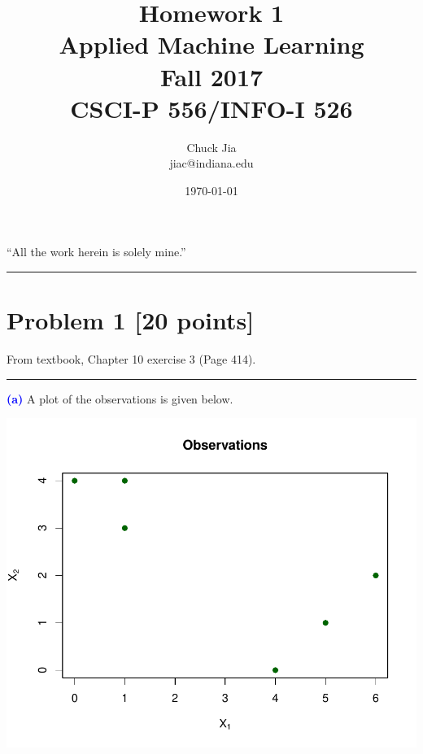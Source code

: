 \documentclass[a4paper,11pt]{article}
\newcommand{\quotes}[1]{``#1''}
\newcommand{\qnum}[1]{\noindent\textcolor{blue}{\textbf{(#1)}}}
\newcommand{\sep}{\begin{center}\textcolor{gray}{\rule{\textwidth}{0.75pt}}\end{center}}
\begin{document}
\title{Homework 1\\ Applied Machine Learning \\ Fall 2017\\ CSCI-P 556/INFO-I 526}         %
  \author{ Chuck Jia \\ jiac@indiana.edu}       %
\date{\today}          %
\maketitle
\quotes{All the work herein is solely mine.}

\begin{center}
\rule{\textwidth}{2pt}
\end{center}






 
\section*{Problem 1 [20 points]} 

From textbook,  Chapter 10 exercise 3 (Page 414).
\sep 

\qnum{a} 
A plot of the observations is given below.

\begin{center}
  \includegraphics[width=0.75\linewidth]{Image/Prob1a.pdf}
\end{center}
\bigskip
\end{document}
